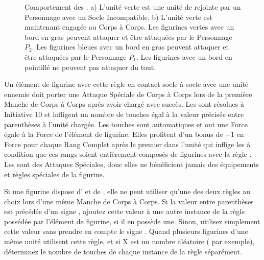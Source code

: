 \newcommand{\figSkirmiA}{a)}
\newcommand{\figSkirmiB}{b)}
\newcommand{\figSkirmiDist}{\smallfontsize 12,5\unit{}{\milli\meter}}
\newcommand{\figSkirmiCharOne}{$P_{1}$}
\newcommand{\figSkirmiCharTwo}{$P_{2}$}

\begin{figure}[!htbp]
\centering
\hypertarget{skirmishersfigure}{
\def\svgwidth{\textwidth}
}
\caption{Comportement des \skirmishers{}.\vspace*{10pt}\newline
a) L'unité verte est une unité de \skirmishers{} rejointe par un Personnage avec un Socle Incompatible.\vspace*{10pt}\newline
b) L'unité verte est maintenant engagée au Corps à Corps. Les figurines vertes avec un bord en gras peuvent attaquer et être attaquées par le Personnage $ P_{2} $. Les figurines bleues avec un bord en gras peuvent attaquer et être attaquées par le Personnage $ P_{1} $.\newline
Les figurines avec un bord en pointillé ne peuvent pas attaquer du tout.}
\label{figure/skirmishers}
\end{figure}


Un élément de figurine avec cette règle en contact socle à socle avec une unité ennemie doit porter une Attaque Spéciale de Corps à Corps lors de la première Manche de Corps à Corps après avoir chargé avec succès. Les \impacthits{} sont résolues à Initiative 10 et infligent un nombre de touches égal à la valeur précisée entre parenthèses à l'unité chargée. Les touches sont automatiques et ont une Force égale à la Force de l'élément de figurine. Elles profitent d'un bonus de +1 en Force pour chaque Rang Complet après le premier dans l'unité qui inflige les \impacthits{} à condition que ces rangs soient entièrement composés de figurines avec la règle \impacthits{}. Les \impacthits{} sont des Attaques Spéciales, donc elles ne bénéficient jamais des équipements et règles spéciales de la figurine.

Si une figurine dispose d'\grindingattacks{} et de \impacthits{}, elle ne peut utiliser qu'une des deux règles au choix lors d'une même Manche de Corps à Corps. Si la valeur entre parenthèses est précédée d'un signe \result{+}, ajoutez cette valeur à une autre instance de la règle \impacthits{} possédée par l'élément de figurine, si il en possède une. Sinon, utilisez simplement cette valeur sans prendre en compte le signe \result{+}. Quand plusieurs figurines d'une même unité utilisent cette règle, et si X est un nombre aléatoire ( par exemple), déterminez le nombre de touches de chaque instance de la règle séparément.

